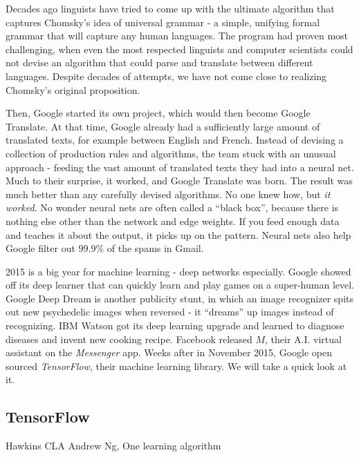 \documentclass[12pt]{article}  %
\begin{document}
Decades ago linguists have tried to come up with the ultimate algorithm that captures Chomsky's idea of universal grammar - a simple, unifying formal grammar that will capture any human languages. The program had proven most challenging, when even the most respected linguists and computer scientists could not devise an algorithm that could parse and translate between different languages. Despite decades of attempts, we have not come close to realizing Chomsky's original proposition.

Then, Google started its own project, which would then become Google Translate. At that time, Google already had a sufficiently large amount of translated texts, for example between English and French. Instead of devising a collection of production rules and algorithms, the team stuck with an unusual approach - feeding the vast amount of translated texts they had into a neural net. Much to their surprise, it worked, and Google Translate was born. The result was much better than any carefully devised algorithms. No one knew how, but \emph{it worked}. No wonder neural nets are often called a ``black box'', because there is nothing else other than the network and edge weights. If you feed enough data and teaches it about the output, it picks up on the pattern. Neural nets also help Google filter out $99.9\%$ of the spams in Gmail.


2015 is a big year for machine learning - deep networks especially. Google showed off its deep learner that can quickly learn and play games on a super-human level. Google Deep Dream is another publicity stunt, in which an image recognizer spits out new psychedelic images when reversed - it ``dreams'' up images instead of recognizing. IBM Watson got its deep learning upgrade and learned to diagnose diseases and invent new cooking recipe. Facebook released $M$, their A.I. virtual assistant on the \emph{Messenger} app. Weeks after in November 2015, Google open sourced \emph{TensorFlow}, their machine learning library. We will take a quick look at it.


\subsection{TensorFlow}




Hawkins
CLA
Andrew Ng, One learning algorithm
\end{document}
